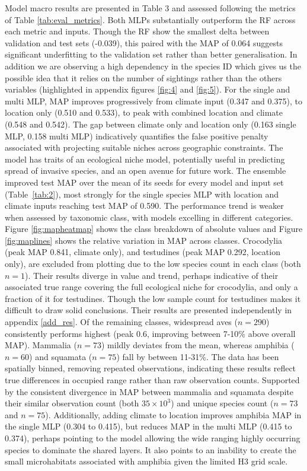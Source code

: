 \documentclass{article}
\begin{document}
\vspace{-18pt}
Model macro results are presented in Table 3 and assessed following the metrics of Table \ref{tab:eval_metrics}. Both MLPs substantially outperform the RF across each metric and inputs. Though the RF show the smallest delta between validation and test sets (-0.039), this paired with the MAP of 0.064 suggests significant underfitting to the validation set rather than better generalisation. In addition we are observing a high dependency in the species ID which gives us the possible idea that it relies on the number of sightings rather than the others variables (highlighted in appendix figures \ref{fig:4} and \ref{fig:5}). For the single and multi MLP, MAP improves progressively from climate input (0.347 and 0.375), to location only (0.510 and 0.533), to peak with combined location and climate (0.548 and 0.542). The gap between climate only and location only (0.163 single MLP, 0.158 multi MLP) indicatively quantifies the false positive penalty associated with projecting suitable niches across geographic constraints. The model has traits of an ecological niche model\cite{Peterson2012}, potentially useful in predicting spread of invasive species, and an open avenue for future work. The ensemble improved test MAP over the mean of its seeds for every model and input set (Table~\ref{tab:2}), most strongly for the single species MLP with location and climate inputs reaching test MAP of 0.590. 
The performance trend is weaker when assessed by taxonomic class, with models excelling in different categories. Figure \ref{fig:mapheatmap} shows the class breakdown of absolute values and Figure \ref{fig:maplines} shows the relative variation in MAP across classes. Crocodylia (peak MAP 0.841, climate only), and testudines (peak MAP 0.292, location only), are excluded from plotting due to the low species count in each class (both \(n=1\)). Their results diverge in value and trend, perhaps indicative of their associated true range covering the full ecological niche for crocodylia, and only a fraction of it for testudines. Though the low sample count for testudines makes it difficult to draw solid conclusions. Their results are presented independently in appendix \ref{add_res}. Of the remaining classes, widespread aves (\(n=290\)) consistently performs highest (peak 0.6, improving between 7-10\% above overall MAP). Mammalia (\(n=73\)) mildly deviates from the mean, whereas amphibia (\(n=60\)) and squamata (\(n=75\)) fall by between 11-31\%. The data has been spatially binned, removing repeated observations, indicating these results reflect true differences in occupied range rather than raw observation counts. Supported by the consistent divergence in MAP between mammalia and squamata despite their similar observation count (both \(35 \times 10^{3}\)) and unique species count (\(n=73\) and \(n=75\)). Additionally, adding climate to location improves amphibia MAP in the single MLP (0.304 to 0.415), but reduces MAP in the multi MLP (0.415 to 0.374), perhaps pointing to the model allowing the wide ranging highly occurring species to dominate the shared layers. It also points to an inability to create the small microhabitats associated with amphibia given the limited H3 grid scale.
\end{document}
